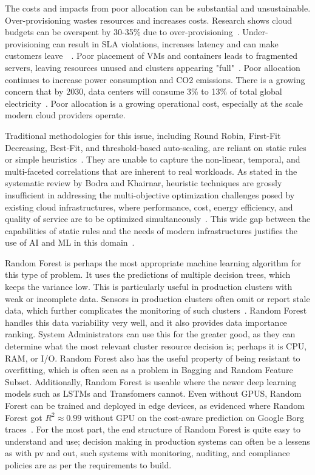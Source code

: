 \documentclass[conference]{IEEEtran}
\begin{document}
The costs and impacts from poor allocation can be substantial and unsustainable. Over-provisioning wastes resources and increases costs. Research shows cloud budgets can be overspent by 30-35\% due to over-provisioning~\cite{Ref8}. Under-provisioning can result in SLA violations, increases latency and can make customers leave~\cite{Ref7}~\cite{Ref8}. Poor placement of VMs and containers leads to fragmented servers, leaving resources unused and clusters appearing "full"~\cite{Ref8}. Poor allocation continues to increase power consumption and CO2 emissions. There is a growing concern that by 2030, data centers will consume 3\% to 13\% of total global electricity~\cite{Ref5}. Poor allocation is a growing operational cost, especially at the scale modern cloud providers operate.

Traditional methodologies for this issue, including Round Robin, First-Fit Decreasing, Best-Fit, and threshold-based auto-scaling, are reliant on static rules or simple heuristics~\cite{Ref6}. They are unable to capture the non-linear, temporal, and multi-faceted correlations that are inherent to real workloads. As stated in the systematic review by Bodra and Khairnar, heuristic techniques are grossly insufficient in addressing the multi-objective optimization challenges posed by existing cloud infrastructures, where performance, cost, energy efficiency, and quality of service are to be optimized simultaneously~\cite{Ref6}. This wide gap between the capabilities of static rules and the needs of modern infrastructures justifies the use of AI and ML in this domain~\cite{Ref7}\cite{Ref8}.

Random Forest is perhaps the most appropriate machine learning algorithm for this type of problem. It uses the predictions of multiple decision trees, which keeps the variance low. This is particularly useful in production clusters with weak or incomplete data. Sensors in production clusters often omit or report stale data, which further complicates the monitoring of such clusters~\cite{Ref2}. Random Forest handles this data variability very well, and it also provides data importance ranking. System Administrators can use this for the greater good, as they can determine what the most relevant cluster resource decision is; perhaps it is CPU, RAM, or I/O. Random Forest also has the useful property of being resistant to overfitting, which is often seen as a problem in Bagging and Random Feature Subset. Additionally, Random Forest is useable where the newer deep learning models such as LSTMs and Transfomers cannot. Even without GPUS, Random Forest can be trained and deployed in edge devices, as evidenced where Random Forest got $R^2 \approx 0.99$ without GPU on the cost-aware prediction on Google Borg traces~\cite{Ref9}. For the most part, the end structure of Random Forest is quite easy to understand and use; decision making in production systems can often be a lessens as with pv and out, such systems with monitoring, auditing, and compliance policies are as per the requirements to build.
\end{document}
